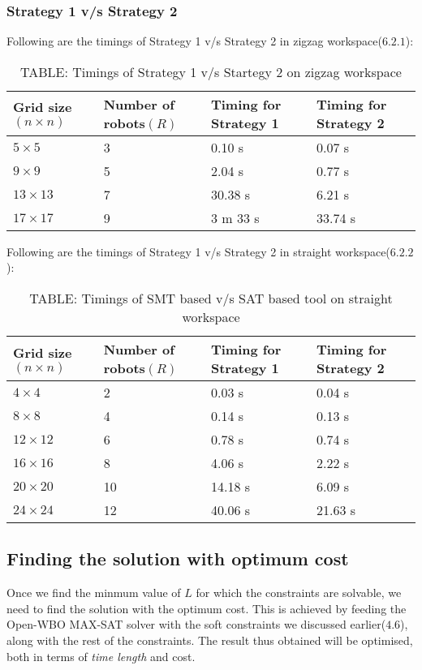 \documentclass{article}[11pt]
\begin{document}
			\subsubsection{Strategy 1 v/s Strategy 2}
			Following are the timings of Strategy 1 v/s Strategy 2 in zigzag workspace($6.2.1$):
				\begin{table}[h!]
				\centering
				\begin{tabular}{|| p{2cm} | p{2cm} | p{2cm} | p{2cm} ||} 
				 \hline\hline
				 Grid size$(n \times n)$ & Number of robots$(R)$ & Timing for Strategy 1 & Timing for Strategy 2 \\ [0.5ex] 
				 \hline\hline
				 $5 \times 5$ & 3 & 0.10 s & 0.07 s \\ 
				 $9 \times 9$ & 5 & 2.04 s & 0.77 s \\
				 $13 \times 13$ & 7 & 30.38 s & 6.21 s \\
				 $17 \times 17$ & 9 & 3 m 33 s & 33.74 s  \\ [1ex]
				 \hline
				\end{tabular}
				\caption*{TABLE: Timings of Strategy 1 v/s Startegy 2 on zigzag workspace}
				\end{table}

			Following are the timings of Strategy 1 v/s Strategy 2 in straight workspace($6.2.2$):
				\begin{table}[h!]
				\centering
				\begin{tabular}{|| p{2cm} | p{2cm} | p{2cm} | p{2cm} ||} 
				 \hline\hline
				 Grid size$(n \times n)$ & Number of robots$(R)$ & Timing for Strategy 1 & Timing for Strategy 2 \\ [0.5ex] 
				 \hline\hline
				 $4 \times 4$ & 2 & 0.03 s & 0.04 s \\ 
				 $8 \times 8$ & 4 & 0.14 s & 0.13 s \\
				 $12 \times 12$ & 6 & 0.78 s & 0.74 s \\
				 $16 \times 16$ & 8 & 4.06 s & 2.22 s \\
				 $20 \times 20$ & 10 & 14.18 s & 6.09 s \\
				 $24 \times 24$ & 12 & 40.06 s & 21.63 s  \\ [1ex]
				 \hline
				\end{tabular}
				\caption*{TABLE: Timings of SMT based v/s SAT based tool on straight workspace}
				\end{table}


		\subsection{Finding the solution with optimum cost}
			Once we find the minmum value of $L$ for which the constraints are solvable, we need to find the solution with the optimum cost. This is achieved by feeding the Open-WBO MAX-SAT solver with the soft constraints we discussed earlier($4.6$), along with the rest of the constraints. The result thus obtained will be optimised, both in terms of \textit{time length} and cost.
\end{document}
